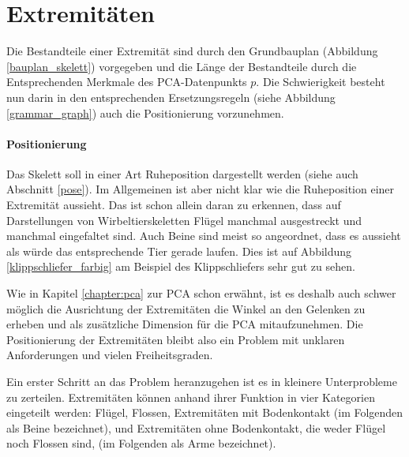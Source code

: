 \section{Extremitäten}
\label{section:extremity_generation}

Die Bestandteile einer Extremität sind durch den Grundbauplan (Abbildung \ref{bauplan_skelett}) vorgegeben und die Länge der Bestandteile durch die Entsprechenden Merkmale des PCA-Datenpunkts $p$. Die Schwierigkeit besteht nun darin in den entsprechenden Ersetzungsregeln (siehe Abbildung \ref{grammar_graph}) auch die Positionierung vorzunehmen.

\paragraph{Positionierung}
Das Skelett soll in einer Art Ruheposition dargestellt werden (siehe auch Abschnitt \ref{pose}). Im Allgemeinen ist aber nicht klar wie die Ruheposition einer Extremität aussieht. Das ist schon allein daran zu erkennen, dass auf Darstellungen von Wirbeltierskeletten Flügel manchmal ausgestreckt und manchmal eingefaltet sind. Auch Beine sind meist so angeordnet, dass es aussieht als würde das entsprechende Tier gerade laufen. Dies ist auf Abbildung \ref{klippschliefer_farbig} am Beispiel des Klippschliefers sehr gut zu sehen.

Wie in Kapitel \ref{chapter:pca} zur PCA schon erwähnt, ist es deshalb auch schwer möglich die Ausrichtung der Extremitäten \bzw die Winkel an den Gelenken zu erheben und als zusätzliche Dimension für die PCA mitaufzunehmen.
Die Positionierung der Extremitäten bleibt also ein Problem mit unklaren Anforderungen und vielen Freiheitsgraden.

Ein erster Schritt an das Problem heranzugehen ist es in kleinere Unterprobleme zu zerteilen.
Extremitäten können anhand ihrer Funktion in vier Kategorien eingeteilt werden:
Flügel, Flossen, Extremitäten mit Bodenkontakt (im Folgenden als Beine bezeichnet), und Extremitäten ohne Bodenkontakt, die weder Flügel noch Flossen sind, (im Folgenden als Arme bezeichnet).

